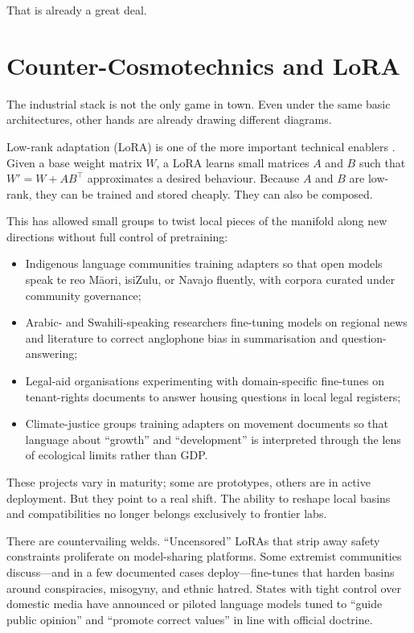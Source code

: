 \documentclass[12pt,a4paper]{article}
\begin{document}
That is already a great deal.

\section{Counter-Cosmotechnics and LoRA}

The industrial stack is not the only game in town. Even under the same basic architectures, other hands are already drawing different diagrams.

Low-rank adaptation (LoRA) is one of the more important technical enablers \cite{hu2021lora}. Given a base weight matrix $W$, a LoRA learns small matrices $A$ and $B$ such that $W' = W + AB^\top$ approximates a desired behaviour. Because $A$ and $B$ are low-rank, they can be trained and stored cheaply. They can also be composed.

This has allowed small groups to twist local pieces of the manifold along new directions without full control of pretraining:

\begin{itemize}
  \item Indigenous language communities training adapters so that open models speak te reo M\={a}ori, isiZulu, or Navajo fluently, with corpora curated under community governance;
  \item Arabic- and Swahili-speaking researchers fine-tuning models on regional news and literature to correct anglophone bias in summarisation and question-answering;
  \item Legal-aid organisations experimenting with domain-specific fine-tunes on tenant-rights documents to answer housing questions in local legal registers;
  \item Climate-justice groups training adapters on movement documents so that language about ``growth'' and ``development'' is interpreted through the lens of ecological limits rather than GDP.
\end{itemize}

These projects vary in maturity; some are prototypes, others are in active deployment. But they point to a real shift. The ability to reshape local basins and compatibilities no longer belongs exclusively to frontier labs.

There are countervailing welds. ``Uncensored'' LoRAs that strip away safety constraints proliferate on model-sharing platforms. Some extremist communities discuss---and in a few documented cases deploy---fine-tunes that harden basins around conspiracies, misogyny, and ethnic hatred. States with tight control over domestic media have announced or piloted language models tuned to ``guide public opinion'' and ``promote correct values'' in line with official doctrine.
\end{document}
